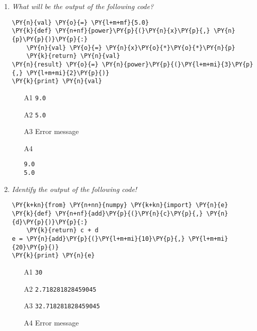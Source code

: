 \begin{enumerate}
\vspace{6mm}

\item {\em What will be the output of the following code?}\\

\begin{Verbatim}[commandchars=\\\{\}]
\PY{n}{val} \PY{o}{=} \PY{l+m+mf}{5.0}
\PY{k}{def} \PY{n+nf}{power}\PY{p}{(}\PY{n}{x}\PY{p}{,} \PY{n}{p}\PY{p}{)}\PY{p}{:}
    \PY{n}{val} \PY{o}{=} \PY{n}{x}\PY{o}{*}\PY{o}{*}\PY{n}{p}
    \PY{k}{return} \PY{n}{val}
\PY{n}{result} \PY{o}{=} \PY{n}{power}\PY{p}{(}\PY{l+m+mi}{3}\PY{p}{,} \PY{l+m+mi}{2}\PY{p}{)}
\PY{k}{print} \PY{n}{val}
\end{Verbatim}
\vspace{6mm}

\begin{enumerate}
\item[A1] {\tt 9.0}
\item[A2] {\tt 5.0}
\item[A3] Error message
\item[A4] 
\begin{verbatim}
9.0
5.0
\end{verbatim}
\end{enumerate}

\vspace{6mm}

\item {\em Identify the output of the following code!}\\

\begin{Verbatim}[commandchars=\\\{\}]
\PY{k+kn}{from} \PY{n+nn}{numpy} \PY{k+kn}{import} \PY{n}{e}
\PY{k}{def} \PY{n+nf}{add}\PY{p}{(}\PY{n}{c}\PY{p}{,} \PY{n}{d}\PY{p}{)}\PY{p}{:}
    \PY{k}{return} c + d
e = \PY{n}{add}\PY{p}{(}\PY{l+m+mi}{10}\PY{p}{,} \PY{l+m+mi}{20}\PY{p}{)}
\PY{k}{print} \PY{n}{e}
\end{Verbatim}

\vspace{6mm}

\begin{enumerate}
\item[A1] {\tt 30}
\item[A2] {\tt 2.718281828459045}
\item[A3] {\tt 32.718281828459045}
\item[A4] Error message
\end{enumerate}

\vspace{6mm}

\end{enumerate}

